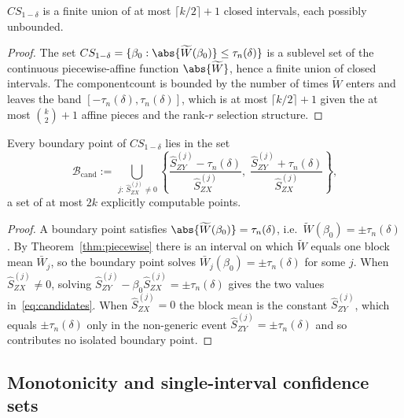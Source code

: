 \begin{corollary}
\label{cor:union}
$CS_{1-\delta}$ is a finite union of at most $\lceil k/2\rceil + 1$ closed intervals, each possibly unbounded.
\end{corollary}
 
\begin{proof}
The set $CS_{1-\delta}=\{\beta_0:\abs{\widetilde{W}(\beta_0)}\le\tau_n(\delta)\}$ is a sublevel set of the continuous piecewise-affine function $\abs{\widetilde{W}}$, hence a finite union of closed intervals. The componentcount is bounded by the number of times $\widetilde{W}$ enters and leaves the band $[-\tau_n(\delta),\tau_n(\delta)]$, which is at most $\lceil k/2\rceil + 1$ given the at most $\binom{k}{2}+1$ affine pieces and the rank-$r$ selection structure.
\end{proof}

\begin{corollary}
\label{cor:endpoints}
Every boundary point of $CS_{1-\delta}$ lies in the set
\begin{equation}
  \mathcal{B}_{\mathrm{cand}}
    := \bigcup_{\,j:\,\hat{S}_{ZX}^{(j)}\neq 0}
       \left\{
         \frac{\hat{S}_{ZY}^{(j)}-\tau_n(\delta)}{\hat{S}_{ZX}^{(j)}},\;
         \frac{\hat{S}_{ZY}^{(j)}+\tau_n(\delta)}{\hat{S}_{ZX}^{(j)}}
       \right\},
  \label{eq:candidates}
\end{equation}
a set of at most $2k$ explicitly computable points.
\end{corollary}
 
\begin{proof}
A boundary point satisfies $\abs{\widetilde{W}(\beta_0)}=\tau_n(\delta)$, i.e.\ $\widetilde{W}(\beta_0)=\pm\tau_n(\delta)$. By Theorem~\ref{thm:piecewise} there is an interval on which $\widetilde{W}$ equals one block mean $\bar{W}_j$, so the boundary point solves $\bar{W}_j(\beta_0)=\pm\tau_n(\delta)$ for some $j$. When $\hat{S}_{ZX}^{(j)}\neq 0$, solving $\hat{S}_{ZY}^{(j)}-\beta_0\hat{S}_{ZX}^{(j)}=\pm\tau_n(\delta)$ gives the two values in~\eqref{eq:candidates}. When $\hat{S}_{ZX}^{(j)}=0$ the block mean is the constant $\hat{S}_{ZY}^{(j)}$, which equals $\pm\tau_n(\delta)$ only in the non-generic event $\hat{S}_{ZY}^{(j)}=\pm\tau_n(\delta)$ and so contributes no isolated boundary point.
\end{proof}

\subsection{Monotonicity and single-interval confidence sets}
\label{sec:monotonicity}

